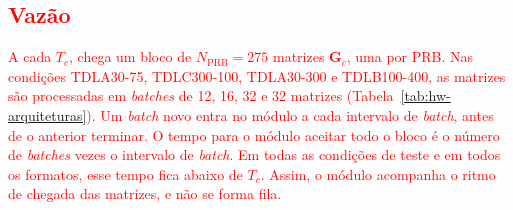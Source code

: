 \subsection{\texorpdfstring{\textcolor{red}{Vazão}}{Vazão}}
\textcolor{red}{A cada $T_c$, chega um bloco de $N_{\text{PRB}} = 275$ matrizes $\mathbf G_c$, uma por PRB. Nas condições TDLA30-75, TDLC300-100, TDLA30-300 e TDLB100-400, as matrizes são processadas em \textit{batches} de 12, 16, 32 e 32 matrizes (Tabela~\ref{tab:hw-arquiteturas}). Um \textit{batch} novo entra no módulo a cada intervalo de \textit{batch}, antes de o anterior terminar. O tempo para o módulo aceitar todo o bloco é o número de \textit{batches} vezes o intervalo de \textit{batch}. Em todas as condições de teste e em todos os formatos, esse tempo fica abaixo de $T_c$. Assim, o módulo acompanha o ritmo de chegada das matrizes, e não se forma fila.}

